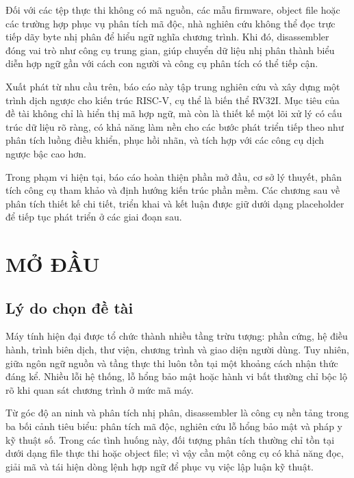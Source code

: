 \documentclass[
]{article}
\begin{document}
Đối với các tệp thực thi không có mã nguồn, các mẫu firmware, object
file hoặc các trường hợp phục vụ phân tích mã độc, nhà nghiên cứu không
thể đọc trực tiếp dãy byte nhị phân để hiểu ngữ nghĩa chương trình. Khi
đó, disassembler đóng vai trò như công cụ trung gian, giúp chuyển dữ
liệu nhị phân thành biểu diễn hợp ngữ gần với cách con người và công cụ
phân tích có thể tiếp cận.

Xuất phát từ nhu cầu trên, báo cáo này tập trung nghiên cứu và xây dựng
một trình dịch ngược cho kiến trúc RISC-V, cụ thể là biến thể RV32I. Mục
tiêu của đề tài không chỉ là hiển thị mã hợp ngữ, mà còn là thiết kế một
lõi xử lý có cấu trúc dữ liệu rõ ràng, có khả năng làm nền cho các bước
phát triển tiếp theo như phân tích luồng điều khiển, phục hồi nhãn, và
tích hợp với các công cụ dịch ngược bậc cao hơn.

Trong phạm vi hiện tại, báo cáo hoàn thiện phần mở đầu, cơ sở lý thuyết,
phân tích công cụ tham khảo và định hướng kiến trúc phần mềm. Các chương
sau về phân tích thiết kế chi tiết, triển khai và kết luận được giữ dưới
dạng placeholder để tiếp tục phát triển ở các giai đoạn sau.

\hypertarget{mux1edf-ux111ux1ea7u}{%
\section{MỞ ĐẦU}\label{mux1edf-ux111ux1ea7u}}

\hypertarget{luxfd-do-chux1ecdn-ux111ux1ec1-tuxe0i}{%
\subsection{\texorpdfstring{ Lý do chọn đề
tài}{ Lý do chọn đề tài}}\label{luxfd-do-chux1ecdn-ux111ux1ec1-tuxe0i}}

Máy tính hiện đại được tổ chức thành nhiều tầng trừu tượng: phần cứng,
hệ điều hành, trình biên dịch, thư viện, chương trình và giao diện người
dùng. Tuy nhiên, giữa ngôn ngữ nguồn và tầng thực thi luôn tồn tại một
khoảng cách nhận thức đáng kể. Nhiều lỗi hệ thống, lỗ hổng bảo mật hoặc
hành vi bất thường chỉ bộc lộ rõ khi quan sát chương trình ở mức mã máy.

Từ góc độ an ninh và phân tích nhị phân, disassembler là công cụ nền
tảng trong ba bối cảnh tiêu biểu: phân tích mã độc, nghiên cứu lỗ hổng
bảo mật và pháp y kỹ thuật số. Trong các tình huống này, đối tượng phân
tích thường chỉ tồn tại dưới dạng file thực thi hoặc object file; vì vậy
cần một công cụ có khả năng đọc, giải mã và tái hiện dòng lệnh hợp ngữ
để phục vụ việc lập luận kỹ thuật.
\end{document}
